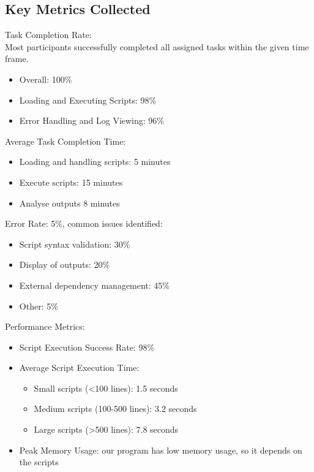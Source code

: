 \documentclass{article}
\begin{document}
\subsection{Key Metrics Collected}
Task Completion Rate: \\
Most participants successfully completed all assigned tasks within the given time frame.
\begin{itemize}
    \item Overall: 100\%
    \item Loading and Executing Scripts: 98\%
    \item Error Handling and Log Viewing: 96\%
\end{itemize}

\noindent Average Task Completion Time:
\begin{itemize}
    \item Loading and handling scripts: 5 minutes
    \item Execute scripts: 15 minutes
    \item Analyse outputs 8 minutes
\end{itemize}

\noindent Error Rate: 5\%, common issues identified:
\begin{itemize}
    \item Script syntax validation: 30\%
    \item Display of outputs: 20\%
    \item External dependency management: 45\%
    \item Other: 5\%
\end{itemize}

\noindent Performance Metrics:
\begin{itemize}
    \item Script Execution Success Rate: 98\%
    \item Average Script Execution Time:
    \begin{itemize}
        \item Small scripts (<100 lines): 1.5 seconds
        \item Medium scripts (100-500 lines): 3.2 seconds
        \item Large scripts (>500 lines): 7.8 seconds
    \end{itemize}
    \item Peak Memory Usage: our program has low memory usage, so it depends on the scripts
\end{itemize}
\end{document}
